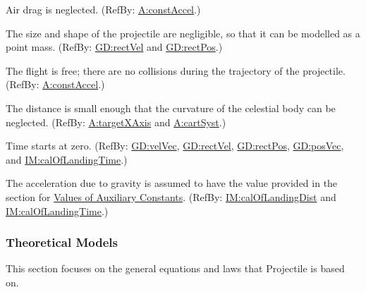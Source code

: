 \documentclass[12pt]{article}
\begin{document}
\begin{description}[font=\normalfont]
\item[neglectDrag:\phantomsection\label{neglectDrag}]{Air drag is neglected. (RefBy: \hyperref[constAccel]{A:constAccel}.)}
\item[pointMass:\phantomsection\label{pointMass}]{The size and shape of the projectile are negligible, so that it can be modelled as a point mass. (RefBy: \hyperref[GD:rectVel]{GD:rectVel} and \hyperref[GD:rectPos]{GD:rectPos}.)}
\item[freeFlight:\phantomsection\label{freeFlight}]{The flight is free; there are no collisions during the trajectory of the projectile. (RefBy: \hyperref[constAccel]{A:constAccel}.)}
\item[neglectCurv:\phantomsection\label{neglectCurv}]{The distance is small enough that the curvature of the celestial body can be neglected. (RefBy: \hyperref[targetXAxis]{A:targetXAxis} and \hyperref[cartSyst]{A:cartSyst}.)}
\item[timeStartZero:\phantomsection\label{timeStartZero}]{Time starts at zero. (RefBy: \hyperref[GD:velVec]{GD:velVec}, \hyperref[GD:rectVel]{GD:rectVel}, \hyperref[GD:rectPos]{GD:rectPos}, \hyperref[GD:posVec]{GD:posVec}, and \hyperref[IM:calOfLandingTime]{IM:calOfLandingTime}.)}
\item[gravAccelValue:\phantomsection\label{gravAccelValue}]{The acceleration due to gravity is assumed to have the value provided in the section for \hyperref[Sec:AuxConstants]{Values of Auxiliary Constants}. (RefBy: \hyperref[IM:calOfLandingDist]{IM:calOfLandingDist} and \hyperref[IM:calOfLandingTime]{IM:calOfLandingTime}.)}
\end{description}
\subsubsection{Theoretical Models}
\label{Sec:TMs}
This section focuses on the general equations and laws that Projectile is based on.
\end{document}
